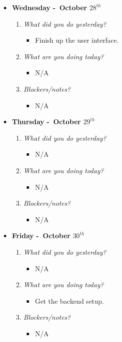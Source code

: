 \begin{itemize}
  \item[] \textbf{\large Wednesday -\ October \(28^{th}\)}
  \begin{enumerate}
    \item \textsl{What did you do yesterday?}
    \begin{itemize}
      \item Finish up the user interface.
    \end{itemize}
    \item \textsl{What are you doing today?}
    \begin{itemize}
      \item N/A
    \end{itemize}
    \item \textsl{Blockers/notes?}
    \begin{itemize}
      \item N/A
    \end{itemize}
  \end{enumerate}
\end{itemize}
\textbf{}
\begin{itemize}
  \item[] \textbf{\large Thursday -\ October \(29^{th}\)}
  \begin{enumerate}
    \item \textsl{What did you do yesterday?}
    \begin{itemize}
      \item N/A
    \end{itemize}
    \item \textsl{What are you doing today?}
    \begin{itemize}
      \item N/A
    \end{itemize}
    \item \textsl{Blockers/notes?}
    \begin{itemize}
      \item N/A
    \end{itemize}
  \end{enumerate}
\end{itemize}
\textbf{}
\begin{itemize}
  \item[] \textbf{\large Friday -\ October \(30^{th}\)}
  \begin{enumerate}
    \item \textsl{What did you do yesterday?}
    \begin{itemize}
      \item N/A
    \end{itemize}
    \item \textsl{What are you doing today?}
    \begin{itemize}
      \item Get the backend setup.
    \end{itemize}
    \item \textsl{Blockers/notes?}
    \begin{itemize}
      \item N/A
    \end{itemize}
  \end{enumerate}
\end{itemize}

